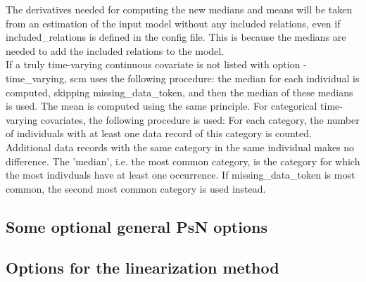 \begin{optionlist}
The derivatives needed for computing the new medians and means will be taken from an estimation of the input model without any included relations, even if included\_relations is defined in the config file. This is because the medians are needed to add the included relations to the model.\\



If a truly time-varying continuous covariate is not listed with option -time\_varying, scm uses the following procedure:
the median for each individual is computed, 
skipping missing\_data\_token, and then the median of these medians is used. The mean is computed using the same principle.
For categorical time-varying covariates, the following procedure is used:
For each category, the number of individuals with at least one data record of this category is counted. Additional data records with 
the same category in the same individual makes no difference.
The 'median', i.e. the most common category, is the category for which the most indivduals have at least one occurrence. 
If missing\_data\_token is most common, the second most common category is used instead.

\nextopt
\end{optionlist}

\subsection{Some optional general PsN options}

\begin{optionlist}

\end{optionlist}


\subsection{Options  for the linearization method}

